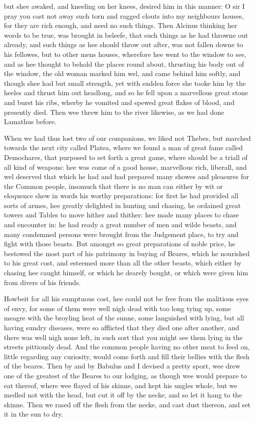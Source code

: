but shee awaked, and kneeling on her knees, desired him in this manner: O sir I
pray you cast not away such torn and ragged clouts into my neighbours houses,
for they are rich enough, and need no such things. Then Alcinus thinking her
words to be true, was brought in beleefe, that such things as he had throwne
out already, and such things as hee should throw out after, was not fallen
downe to his fellowes, but to other mens houses, wherefore hee went to the
window to see, and as hee thought to behold the places round about, thrusting
his body out of the window, the old woman marked him wel, and came behind him
softly, and though shee had but small strength, yet with sudden force she tooke
him by the heeles and thrust him out headlong, and so he fell upon a marvellous
great stone and burst his ribs, wherby he vomited and spewed great flakes of
blood, and presently died. Then wee threw him to the river likewise, as we had
done Lamathus before.

When we had thus lost two of our companions, we liked not Thebes, but marched
towards the next city called Platea, where we found a man of great fame called
Demochares, that purposed to set forth a great game, where should be a triall
of all kind of weapons: hee was come of a good house, marvellous rich,
liberall, and wel deserved that which he had and had prepared many showes and
pleasures for the Common people, insomuch that there is no man can either by
wit or eloquence shew in words his worthy preparations: for first he had
provided all sorts of armes, hee greatly delighted in hunting and chasing, he
ordained great towers and Tables to move hither and thither: hee made many
places to chase and encounter in: he had ready a great number of men and wilde
beasts, and many condemned persons were brought from the Judgement place, to
try and fight with those beasts. But amongst so great preparations of noble
price, he bestowed the most part of his patrimony in buying of Beares, which he
nourished to his great cost, and esteemed more than all the other beasts, which
either by chasing hee caught himself, or which he dearely bought, or which were
given him from divers of his friends.

Howbeit for all his sumptuous cost, hee could not be free from the malitious
eyes of envy, for some of them were well nigh dead with too long tying up, some
meagre with the broyling heat of the sunne, some languished with lying, but all
having sundry diseases, were so afflicted that they died one after another, and
there was well nigh none left, in such sort that you might see them lying in
the streets pittiously dead. And the common people having no other meat to feed
on, little regarding any curiosity, would come forth and fill their bellies
with the flesh of the beares. Then by and by Babulus and I devised a pretty
sport, wee drew one of the greatest of the Beares to our lodging, as though wee
would prepare to eat thereof, where wee flayed of his skinne, and kept his
ungles whole, but we medled not with the head, but cut it off by the necke, and
so let it hang to the skinne. Then we rased off the flesh from the necke, and
cast dust thereon, and set it in the sun to dry.

